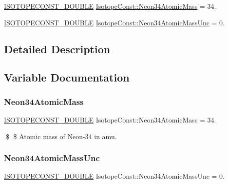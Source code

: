 \begin{DoxyCompactItemize}
\item 
\mbox{\hyperlink{group___isotope_const-_macros_ga8f45a7272ce02c0b4c65c44636ed719a}{I\+S\+O\+T\+O\+P\+E\+C\+O\+N\+S\+T\+\_\+\+D\+O\+U\+B\+LE}} \mbox{\hyperlink{group___isotope_const-_neon-_ne34_gadda5977cd9785e4f2173fcba9768d8ad}{Isotope\+Const\+::\+Neon34\+Atomic\+Mass}} = 34.
\item 
\mbox{\hyperlink{group___isotope_const-_macros_ga8f45a7272ce02c0b4c65c44636ed719a}{I\+S\+O\+T\+O\+P\+E\+C\+O\+N\+S\+T\+\_\+\+D\+O\+U\+B\+LE}} \mbox{\hyperlink{group___isotope_const-_neon-_ne34_gafa63deea39d3f46cf0ec95fca479f5d7}{Isotope\+Const\+::\+Neon34\+Atomic\+Mass\+Unc}} = 0.
\end{DoxyCompactItemize}


\subsection{Detailed Description}


\subsection{Variable Documentation}
\mbox{\label{group___isotope_const-_neon-_ne34_gadda5977cd9785e4f2173fcba9768d8ad}} 
\subsubsection{\texorpdfstring{Neon34\+Atomic\+Mass}{Neon34AtomicMass}}
{\footnotesize\ttfamily \mbox{\hyperlink{group___isotope_const-_macros_ga8f45a7272ce02c0b4c65c44636ed719a}{I\+S\+O\+T\+O\+P\+E\+C\+O\+N\+S\+T\+\_\+\+D\+O\+U\+B\+LE}} Isotope\+Const\+::\+Neon34\+Atomic\+Mass = 34.}

\$ \$ Atomic mass of Neon-\/34 in amu. \mbox{\label{group___isotope_const-_neon-_ne34_gafa63deea39d3f46cf0ec95fca479f5d7}} 
\subsubsection{\texorpdfstring{Neon34\+Atomic\+Mass\+Unc}{Neon34AtomicMassUnc}}
{\footnotesize\ttfamily \mbox{\hyperlink{group___isotope_const-_macros_ga8f45a7272ce02c0b4c65c44636ed719a}{I\+S\+O\+T\+O\+P\+E\+C\+O\+N\+S\+T\+\_\+\+D\+O\+U\+B\+LE}} Isotope\+Const\+::\+Neon34\+Atomic\+Mass\+Unc = 0.}


